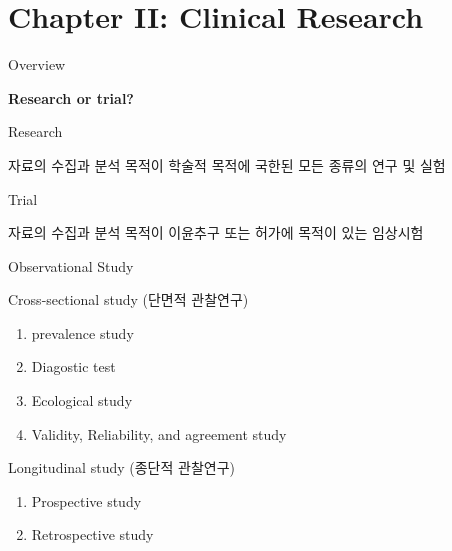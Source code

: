 \documentclass[9pt,ignorenonframetext,xcolor=dvipsnames]{beamer}
\providecommand{\tightlist}{%
  \setlength{\itemsep}{0pt}\setlength{\parskip}{0pt}}
\newlength{\wideitemsep}
\let\olditem\item
\renewcommand{\item}{\setlength{\itemsep}{\wideitemsep}\olditem}
\begin{document}
\section{Chapter II: Clinical
Research}\label{chapter-ii-clinical-research}

\begin{frame}{Overview}

\LARGE{\textbf{Research or trial?}}

\begin{block}{Research}

\normalsize{자료의 수집과 분석 목적이 학술적 목적에 국한된 모든 종류의 연구 및 실험}

\end{block}

\begin{block}{Trial}

\normalsize{자료의 수집과 분석 목적이 이윤추구 또는 허가에 목적이 있는 임상시험}

\end{block}

\end{frame}

\begin{frame}{Observational Study}

\begin{block}{Cross-sectional study (단면적 관찰연구)}

\begin{enumerate}
\def\labelenumi{\arabic{enumi}.}
\tightlist
\item
  prevalence study
\item
  Diagostic test
\item
  Ecological study
\item
  Validity, Reliability, and agreement study
\end{enumerate}

\end{block}

\begin{block}{Longitudinal study (종단적 관찰연구)}

\begin{enumerate}
\def\labelenumi{\arabic{enumi}.}
\tightlist
\item
  Prospective study
\item
  Retrospective study
\end{enumerate}

\end{block}

\end{frame}
\end{document}
